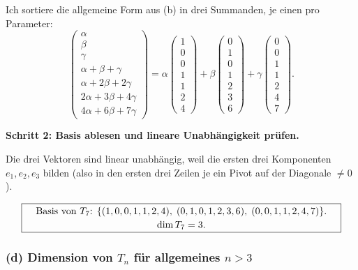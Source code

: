 \documentclass[a4paper,12pt]{article}
\begin{document}
Ich sortiere die allgemeine Form aus (b) in drei Summanden, je einen pro Parameter:
\[
\begin{pmatrix} \alpha \\ \beta \\ \gamma \\ \alpha+\beta+\gamma \\ \alpha+2\beta+2\gamma \\ 2\alpha+3\beta+4\gamma \\ 4\alpha+6\beta+7\gamma \end{pmatrix}
= \alpha \begin{pmatrix} 1 \\ 0 \\ 0 \\ 1 \\ 1 \\ 2 \\ 4 \end{pmatrix}
+ \beta \begin{pmatrix} 0 \\ 1 \\ 0 \\ 1 \\ 2 \\ 3 \\ 6 \end{pmatrix}
+ \gamma \begin{pmatrix} 0 \\ 0 \\ 1 \\ 1 \\ 2 \\ 4 \\ 7 \end{pmatrix}.
\]

\textbf{Schritt 2: Basis ablesen und lineare Unabh\"angigkeit pr\"ufen.}

Die drei Vektoren sind linear unabh\"angig, weil die ersten drei Komponenten $e_1, e_2, e_3$ bilden (also in den ersten drei Zeilen je ein Pivot auf der Diagonale $\neq 0$).

\[
\fbox{\parbox{0.93\textwidth}{\centering
Basis von $T_7$: $\{(1,0,0,1,1,2,4),\; (0,1,0,1,2,3,6),\; (0,0,1,1,2,4,7)\}$.\\[2pt]
$\dim T_7 = 3$.
}}
\]

\subsubsection*{(d) Dimension von $T_n$ f\"ur allgemeines $n > 3$}
\end{document}
